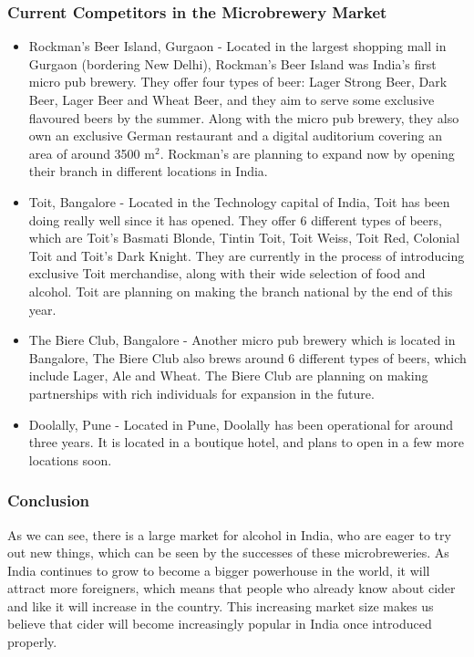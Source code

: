 \documentclass{article}
\begin{document}
\subsubsection{Current Competitors in the Microbrewery Market}
\begin{itemize}
\item Rockman's Beer Island, Gurgaon - Located in the largest shopping mall in 
			 Gurgaon (bordering New Delhi), Rockman's Beer Island was India's first
			 micro pub brewery. They offer four types of beer: Lager Strong Beer, Dark
			 Beer, Lager Beer and Wheat Beer, and they aim to serve some exclusive
 	     flavoured beers by the summer. Along with the micro pub brewery, they also
			 own an exclusive German restaurant and a digital auditorium covering an
	     area of around 3500 m$^2$. Rockman's are planning to expand now by opening
			 their branch in different locations in India.
\item Toit, Bangalore - Located in the Technology capital of India, Toit has been
			 doing really well since it has opened. They offer 6 different types of beers,
			 which are Toit's Basmati Blonde, Tintin Toit, Toit Weiss, Toit Red, Colonial
			 Toit and Toit's Dark Knight. They are currently in the process of introducing
			 exclusive Toit merchandise, along with their wide selection of food and alcohol.
			 Toit are planning on making the branch national by the end of this year.
\item The Biere Club, Bangalore - Another micro pub brewery which is located in
			 Bangalore, The Biere Club also brews around 6 different types of beers, which
			 include Lager, Ale and Wheat. The Biere Club are planning on making
			 partnerships with rich individuals for expansion in the future.
\item Doolally, Pune - Located in Pune, Doolally has been operational for around
			 three years. It is located in a boutique hotel, and plans to open in a few more
			 locations soon.
\end{itemize}

\subsubsection{Conclusion}
As we can see, there is a large market for alcohol in India, who are eager to try
out new things, which can be seen by the successes of these microbreweries. As India
continues to grow to become a bigger powerhouse in the world, it will attract more
foreigners, which means that people who already know about cider and like it
will increase in the country. This increasing market size makes us believe that
cider will become increasingly popular in India once introduced properly.
\end{document}
